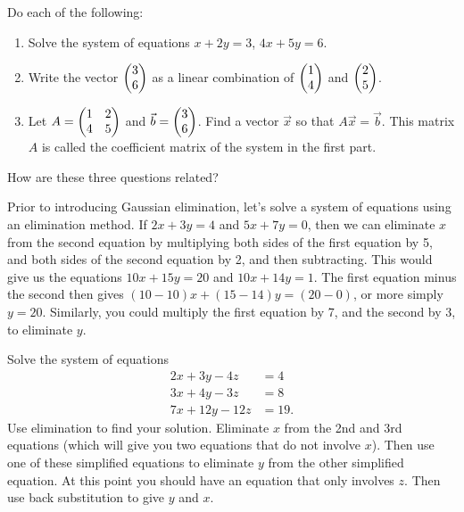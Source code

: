 \begin{problem}
Do each of the following:
\begin{enumerate}
 \item Solve the system of equations $x+2y=3$, $4x+5y=6$.
 \item Write the vector $\begin{pmatrix} 3\\6 \end{pmatrix}$ as a linear combination of $\begin{pmatrix} 1\\4 \end{pmatrix}$ and $\begin{pmatrix} 2\\5 \end{pmatrix}$.
 \item Let $A = \begin{pmatrix} 1&2\\4&5 \end{pmatrix}$ and $\vec b=\begin{pmatrix} 3\\6 \end{pmatrix}$.  Find a vector $\vec x$ so that $A\vec x = \vec b$. This matrix $A$ is called the coefficient matrix of the system in the first part.  
\end{enumerate}
How are these three questions related?
 
\end{problem}

Prior to introducing Gaussian elimination, let's solve a system of equations using an elimination method.  If $2x+3y=4$ and $5x+7y=0$, then we can eliminate $x$ from the second equation by multiplying both sides of the first equation by 5, and both sides of the second equation by 2, and then subtracting.  This would give us the equations $10x+15y=20$ and $10x+14y=1$. The first equation minus the second then gives $(10-10)x+(15-14)y=(20-0)$, or more simply $y=20$. Similarly, you could multiply the first equation by 7, and the second by $3$, to eliminate $y$.  

\begin{problem}
 Solve the system of equations 
\begin{align*}
  2x+3y-4z&=4\\  
  3x+4y-3z&=8\\  
  7x+12y-12z&=19.  
\end{align*}
Use elimination to find your solution. Eliminate $x$ from the 2nd and 3rd equations (which will give you two equations that do not involve $x$). Then use one of these simplified equations to eliminate $y$ from the other simplified equation. At this point you should have an equation that only involves $z$. Then use back substitution to give $y$ and $x$.   
\end{problem}

